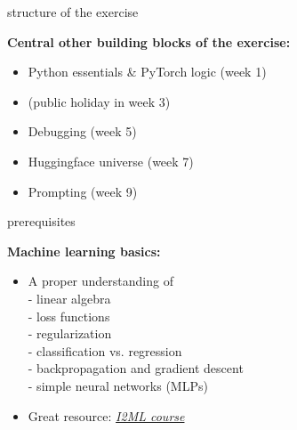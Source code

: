 \begin{vbframe}{structure of the exercise}

\vfill

\textbf{Central other building blocks of the exercise:}

	\begin{itemize}
		\item Python essentials \& PyTorch logic (week 1)
		\item (public holiday in week 3)
		\item Debugging (week 5)
		\item Huggingface universe (week 7)
		\item Prompting (week 9)
	\end{itemize}

\vfill

\end{vbframe}


\begin{vbframe}{prerequisites}
	
\vfill
	
\textbf{Machine learning basics:}

		\begin{itemize}
				\item A proper understanding of\\
				- linear algebra\\
				- loss functions\\
				- regularization\\
				- classification vs. regression\\
				- backpropagation and gradient descent\\
				- simple neural networks (MLPs)
				\item Great resource: \href{https://slds-lmu.github.io/i2ml/}{\textit{I2ML course}}
		\end{itemize}

\vfill

\end{vbframe}


